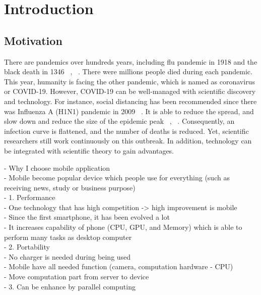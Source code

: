 \chapter{Introduction}\label{intro}
    \section{Motivation}

            There are pandemics over hundreds years, including flu pandemic in 1918 and the black death in 1346 ~\cite{REF1-01}, ~\cite{REF1-02}.
            There were millions people died during each pandemic.
            This year, humanity is facing the other pandemic, which is named as coronavirus or COVID-19.
            However, COVID-19 can be well-managed with scientific discovery and technology.
            For instance, social distancing has been recommended since there was Influenza A (H1N1) pandemic in 2009 ~\cite{REF1-05}.
            It is able to reduce the spread, and slow down and reduce the size of the epidemic peak ~\cite{REF1-03}, ~\cite{REF1-04}.
            Consequently, an infection curve is flattened, and the number of deaths is reduced.
            Yet, scientific researchers still work continuously on this outbreak.
            In addition, technology can be integrated with scientific theory to gain advantages.



        -	Why I choose mobile application \\
            - Mobile become popular device which people use for everything (such as receiving news, study or business purpose) \\
            - 1. Performance \\
                - One technology that has high competition -> high improvement is mobile \\
                - Since the first smartphone, it has been evolved a lot \\
                - It increases capability of phone (CPU, GPU, and Memory) which is able to perform many tasks as desktop computer \\
            - 2. Portability \\
                - No charger is needed during being used \\
                - Mobile have all needed function (camera, computation hardware - CPU) \\
                - Move computation part from server to device \\
            - 3. Can be enhance by parallel computing \\

